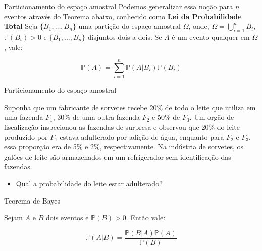 \begin{frame}{Particionamento do espaço amostral}
    Podemos generalizar essa noção para $n$ eventos através do Teorema abaixo, conhecido como \textbf{Lei da Probabilidade Total}
    Seja $\{B_1, \dots, B_n\}$ uma partição do espaço amostral $\Omega$, onde, $\Omega=\bigcup_{i=1}^n B_i$, $\mathds{P}(B_i)>0$ e $\{B_1, \dots, B_n\}$ disjuntos dois a dois. Se $A$ é um evento qualquer em $\Omega$, vale:

    $$\mathds{P}(A) = \sum_{i=1}^n \mathds{P}(A|B_i)\mathds{P}(B_i)$$
\end{frame}

\begin{frame}{Particionamento do espaço amostral}
\begin{exemplo}[2]
    Suponha que um fabricante de sorvetes recebe 20\% de todo o leite que utiliza em uma fazenda $F_1$, 30\% de uma outra fazenda $F_2$ e 50\% de $F_3$. Um orgão de fiscalização inspecionou as fazendas de surpresa e observou que 20\% do leite produzido por $F_1$ estava adulterado por adição de água, enquanto para $F_2$ e $F_3$, essa proporção era de 5\% e 2\%, respectivamente. Na indústria de sorvetes, os galões de leite são armazenados em um refrigerador sem identificação das fazendas. 

    \begin{itemize}
        \item Qual a probabilidade do leite estar adulterado?
    \end{itemize}
\end{exemplo}
\end{frame}

\begin{frame}{Teorema de Bayes}

    Sejam $A$ e $B$ dois eventos e $\mathds{P}(B)>0$. Então vale:
    
$$\mathds{P}(A|B) = \dfrac{\mathds{P}(B | A)\mathds{P}(A)}{\mathds{P}(B)}$$
    
\end{frame}

